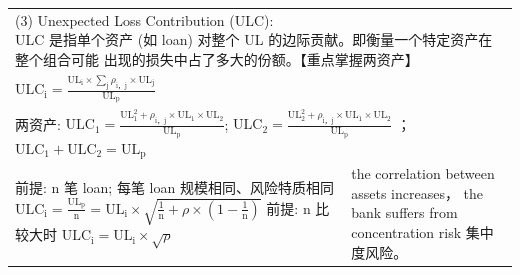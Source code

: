 \begin{center}
{\begin{tabular}{|p{}|p{}|}
    \cline{1-2}
    \multicolumn{2}{|p{1.2\textwidth}|}{(3) Unexpected Loss Contribution (ULC):\newline ULC 是指单个资产 (如 loan) 对整个 UL 的边际贡献。即衡量一个特定资产在整个组合可能 出现的损失中占了多大的份额。【重点掌握两资产】} \\
    \cline{1-2}
    \({\mathrm{{ULC}}}_{\mathrm{i}} = \frac{{\mathrm{{UL}}}_{\mathrm{i}} \times  \mathop{\sum }\limits_{\mathrm{j}}{\rho }_{\mathrm{i}，\mathrm{j}} \times  {\mathrm{{UL}}}_{\mathrm{j}}}{{\mathrm{{UL}}}_{\mathrm{p}}}\) & \phantom{X} \\
    \cline{1-2}
    \multicolumn{2}{|p{1.2\textwidth}|}{两资产:\newline \({\mathrm{{ULC}}}_{1} = \frac{{\mathrm{{UL}}}_{1}^{2} + {\rho }_{\mathrm{i}，\mathrm{j}} \times  {\mathrm{{UL}}}_{1} \times  {\mathrm{{UL}}}_{2}}{{\mathrm{{UL}}}_{\mathrm{p}}}  \);     
    \({\mathrm{{ULC}}}_{2} = \frac{{\mathrm{{UL}}}_{2}^{2} + {\rho }_{\mathrm{i}，\mathrm{j}} \times  {\mathrm{{UL}}}_{1} \times  {\mathrm{{UL}}}_{2}}{{\mathrm{{UL}}}_{\mathrm{p}}}\) ； \({\mathrm{{ULC}}}_{1} + {\mathrm{{ULC}}}_{2} = {\mathrm{{UL}}}_{\mathrm{p}}\)} \\
    \cline{1-2}
    前提: \(\mathrm{n}\) 笔 loan; 每笔 loan 规模相同、风险特质相同\newline \({\mathrm{{ULC}}}_{\mathrm{i}} = \frac{{\mathrm{{UL}}}_{\mathrm{p}}}{\mathrm{n}} = {\mathrm{{UL}}}_{\mathrm{i}} \times  \sqrt{\frac{1}{\mathrm{n}} + \rho  \times  \left( {1 - \frac{1}{\mathrm{n}}}\right) }\) \newline 前提: \(\mathrm{n}\) 比较大时  \newline \({\mathrm{{ULC}}}_{\mathrm{i}} = {\mathrm{{UL}}}_{\mathrm{i}} \times  \sqrt{\rho }\) & the correlation between assets increases， the bank suffers from concentration risk 集中度风险。 \\
    \cline{1-2}
    \hline
    \end{tabular}
    }
    \end{center}



